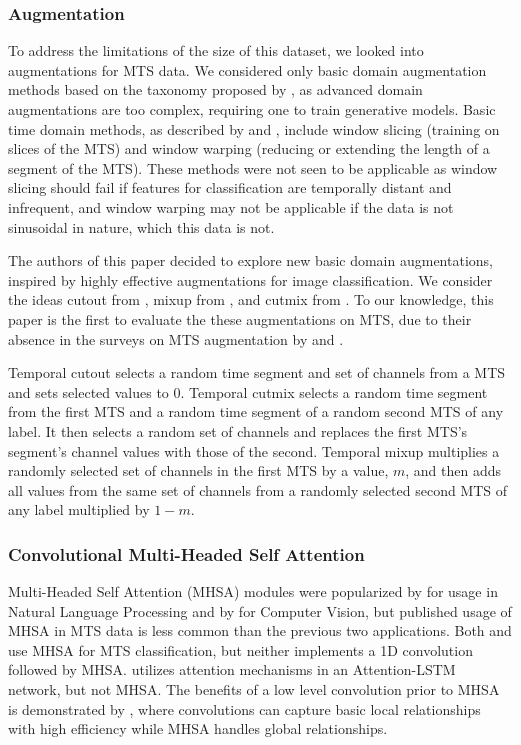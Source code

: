 \documentclass[letterpaper]{article} %
\begin{document}
\subsubsection{Augmentation}

To address the limitations of the size of this dataset, we looked into augmentations for MTS data. We considered only basic domain augmentation methods based on the taxonomy proposed by \cite{wen2020time}, as advanced domain augmentations are too complex, requiring one to train generative models. Basic time domain methods, as described by \cite{le2016data} and \cite{wen2020time}, include window slicing (training on slices of the MTS) and window warping (reducing or extending the length of a segment of the MTS). These methods were not seen to be applicable as window slicing should fail if features for classification are temporally distant and infrequent, and window warping may not be applicable if the data is not sinusoidal in nature, which this data is not.

The authors of this paper decided to explore new basic domain augmentations, inspired by highly effective augmentations for image classification. We consider the ideas cutout from \cite{devries2017improved}, mixup from \cite{zhang2017mixup}, and cutmix from \cite{yun2019cutmix}. To our knowledge, this paper is the first to evaluate the these augmentations on MTS, due to their absence in the surveys on MTS augmentation by \cite{wen2020time} and \cite{iwana2021empirical}.
 
Temporal cutout selects a random time segment and set of channels from a MTS and sets selected values to 0. Temporal cutmix selects a random time segment from the first MTS and a random time segment of a random second MTS of any label. It then selects a random set of channels and replaces the first MTS's segment's channel values with those of the second. Temporal mixup multiplies a randomly selected set of channels in the first MTS by a value, $m$, and then adds all values from the same set of channels from a randomly selected second MTS of any label multiplied by $1 - m$. 


\subsubsection{Convolutional Multi-Headed Self Attention}

Multi-Headed Self Attention (MHSA) modules were popularized by \cite{devlin2018bert} for usage in Natural Language Processing and by \cite{dosovitskiy2020image} for Computer Vision, but published usage of MHSA in MTS data is less common than the previous two applications. Both \cite{song2018attend} and \cite{russwurm2020self}  use MHSA for MTS classification, but neither implements a 1D convolution followed by MHSA. \cite{karim2019multivariate} utilizes attention mechanisms in an Attention-LSTM network, but not MHSA. The benefits of a low level convolution prior to MHSA is demonstrated by \cite{gulati2020conformer}, where convolutions can capture basic local relationships with high efficiency while MHSA handles global relationships. 
\end{document}

